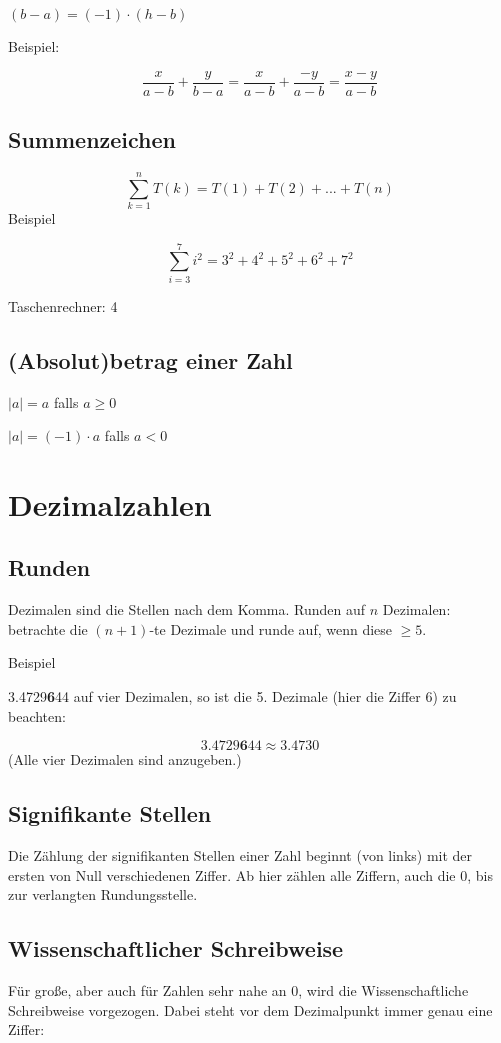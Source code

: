 \begin{multicols}{2}
$(b-a)=(-1)\cdot{}(h-b)$

Beispiel:

$$\frac{x}{a-b} +  \frac{y}{b-a} = \frac{x}{a-b} + \frac{-y}{a-b} = \frac{x-y}{a-b}$$

\hrulefill

\subsection{Summenzeichen}
$$\sum_{k=1}^n{T(k)} = T(1) + T(2) + ... + T(n)$$
Beispiel

$$\sum_{i=3}^7{i^2} = 3^2 + 4^2 + 5^2 + 6^2 + 7^2$$

Taschenrechner:  4


\hrulefill

\subsection{(Absolut)betrag einer Zahl}

$|a| = a$ falls $a \ge 0$

$|a| = (-1)\cdot{}a$ falls $a < 0$


\section{Dezimalzahlen}
\subsection{Runden}
Dezimalen sind die Stellen nach dem Komma.
Runden auf $n$ Dezimalen: betrachte die $(n+1)$-te Dezimale und runde auf, wenn diese $\ge 5$.

Beispiel

3.4729\textbf{6}44 auf vier Dezimalen, so ist die 5. Dezimale (hier die Ziffer 6) zu beachten:

$$3.4729\textbf{6}44 \approx 3.4730$$
(Alle vier Dezimalen sind anzugeben.)

\hrulefill

\subsection{Signifikante Stellen}
Die Zählung der signifikanten Stellen einer Zahl beginnt (von links) mit der ersten von Null verschiedenen Ziffer. Ab hier zählen alle Ziffern, auch die 0, bis zur verlangten Rundungsstelle.

\subsection{Wissenschaftlicher Schreibweise}
Für große, aber auch für Zahlen sehr nahe an 0, wird die Wissenschaftliche Schreibweise vorgezogen. Dabei steht vor dem Dezimalpunkt immer genau eine Ziffer:


\end{multicols}
